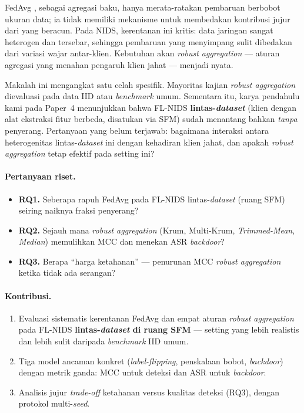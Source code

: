 \documentclass[11pt,a4paper]{article}
\begin{document}
FedAvg \cite{popoola}, sebagai agregasi baku, hanya merata-ratakan pembaruan
berbobot ukuran data; ia tidak memiliki mekanisme untuk membedakan kontribusi jujur
dari yang beracun. Pada NIDS, kerentanan ini kritis: data jaringan sangat
heterogen dan tersebar, sehingga pembaruan yang menyimpang sulit dibedakan dari
variasi wajar antar-klien. Kebutuhan akan \emph{robust aggregation} --- aturan
agregasi yang menahan pengaruh klien jahat --- menjadi nyata.

Makalah ini mengangkat satu celah spesifik. Mayoritas kajian \emph{robust
aggregation} \cite{fkrum,ftrimmed} dievaluasi pada data IID atau \emph{benchmark}
umum. Sementara itu, karya pendahulu kami pada Paper~4 menunjukkan bahwa FL-NIDS
\textbf{lintas-\emph{dataset}} (klien dengan alat ekstraksi fitur berbeda, disatukan
via SFM) sudah menantang bahkan \emph{tanpa} penyerang. Pertanyaan yang belum
terjawab: bagaimana interaksi antara heterogenitas lintas-\emph{dataset} ini dengan
kehadiran klien jahat, dan apakah \emph{robust aggregation} tetap efektif pada
setting ini?

\paragraph{Pertanyaan riset.}
\begin{itemize}
  \item \textbf{RQ1.} Seberapa rapuh FedAvg pada FL-NIDS lintas-\emph{dataset}
  (ruang SFM) seiring naiknya fraksi penyerang?
  \item \textbf{RQ2.} Sejauh mana \emph{robust aggregation} (Krum, Multi-Krum,
  \emph{Trimmed-Mean}, \emph{Median}) memulihkan MCC dan menekan ASR \emph{backdoor}?
  \item \textbf{RQ3.} Berapa ``harga ketahanan'' --- penurunan MCC \emph{robust
  aggregation} ketika tidak ada serangan?
\end{itemize}

\paragraph{Kontribusi.}
\begin{enumerate}
  \item Evaluasi sistematis kerentanan FedAvg dan empat aturan \emph{robust
  aggregation} pada FL-NIDS \textbf{lintas-\emph{dataset} di ruang SFM} --- setting
  yang lebih realistis dan lebih sulit daripada \emph{benchmark} IID umum.
  \item Tiga model ancaman konkret (\emph{label-flipping}, penskalaan bobot,
  \emph{backdoor}) dengan metrik ganda: MCC untuk deteksi dan ASR untuk \emph{backdoor}.
  \item Analisis jujur \emph{trade-off} ketahanan versus kualitas deteksi
  (RQ3), dengan protokol multi-\emph{seed}.
\end{enumerate}
\end{document}

